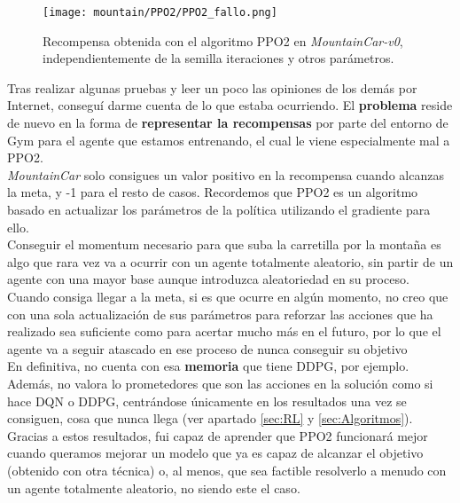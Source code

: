 \documentclass[11pt,fleqn]{book} %
\begin{document}
\begin{figure}[H]
	\centering\texttt{[image: mountain/PPO2/PPO2\_fallo.png]}
	\caption{Recompensa obtenida con el algoritmo PPO2 en \textit{MountainCar-v0}, independientemente de la semilla iteraciones y otros parámetros.}
	\label{fig:mountain12} %
\end{figure}

Tras realizar algunas pruebas y leer un poco las opiniones de los demás por Internet, conseguí darme cuenta de lo que estaba ocurriendo. El \textbf{problema} reside de nuevo en la forma de \textbf{representar la recompensas} por parte del entorno de Gym para el agente que estamos entrenando, el cual le viene especialmente mal a PPO2. \\

\textit{MountainCar} solo consigues un valor positivo en la recompensa cuando alcanzas la meta, y -1 para el resto de casos. Recordemos que PPO2 es un algoritmo basado en actualizar los parámetros de la política utilizando el gradiente para ello. \\

Conseguir el momentum necesario para que suba la carretilla por la montaña es algo que rara vez va a ocurrir con un agente totalmente aleatorio, sin partir de un agente con una mayor base aunque introduzca aleatoriedad en su proceso. \\

Cuando consiga llegar a la meta, si es que ocurre en algún momento, no creo que con una sola actualización de sus parámetros para reforzar las acciones que ha realizado sea suficiente como para acertar mucho más en el futuro, por lo que el agente va a seguir atascado en ese proceso de nunca conseguir su objetivo \\

En definitiva, no cuenta con esa \textbf{memoria} que tiene DDPG, por ejemplo. Además, no valora lo prometedores que son las acciones en la solución como si hace DQN o DDPG, centrándose únicamente en los resultados una vez se consiguen, cosa que nunca llega (ver apartado \ref{sec:RL} y \ref{sec:Algoritmos}). \\

Gracias a estos resultados, fui capaz de aprender que PPO2 funcionará mejor cuando queramos mejorar un modelo que ya es capaz de alcanzar el objetivo (obtenido con otra técnica) o, al menos, que sea factible resolverlo a menudo con un agente totalmente aleatorio, no siendo este el caso.\cite{article:PPO2error}
\end{document}
